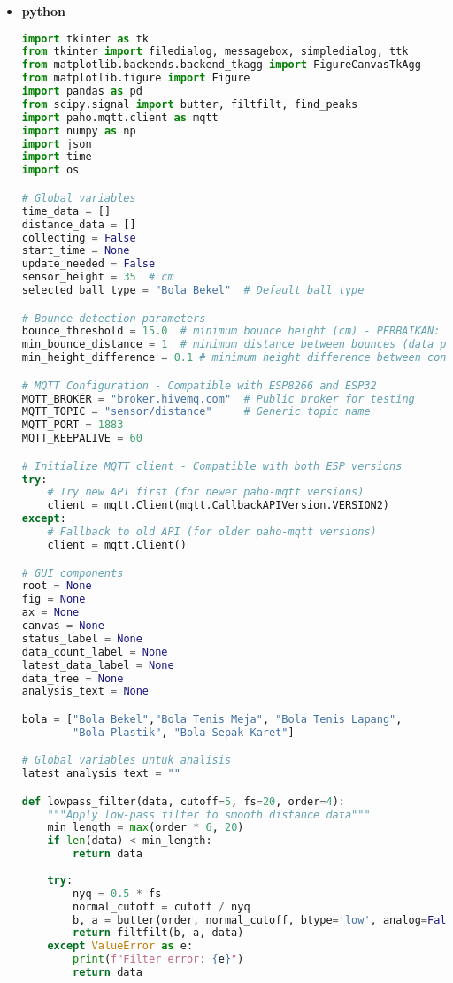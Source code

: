 \begin{itemize}

   \item \textbf{python}
   \begin{scriptsize}
    \begin{lstlisting}[language=python]
        import tkinter as tk
from tkinter import filedialog, messagebox, simpledialog, ttk
from matplotlib.backends.backend_tkagg import FigureCanvasTkAgg
from matplotlib.figure import Figure
import pandas as pd
from scipy.signal import butter, filtfilt, find_peaks
import paho.mqtt.client as mqtt
import numpy as np
import json
import time
import os

# Global variables
time_data = []
distance_data = []
collecting = False
start_time = None
update_needed = False
sensor_height = 35  # cm
selected_ball_type = "Bola Bekel"  # Default ball type

# Bounce detection parameters
bounce_threshold = 15.0  # minimum bounce height (cm) - PERBAIKAN: dari 5.0 ke 15.0
min_bounce_distance = 1  # minimum distance between bounces (data points)
min_height_difference = 0.1 # minimum height difference between consecutive peaks (cm)

# MQTT Configuration - Compatible with ESP8266 and ESP32
MQTT_BROKER = "broker.hivemq.com"  # Public broker for testing
MQTT_TOPIC = "sensor/distance"     # Generic topic name
MQTT_PORT = 1883
MQTT_KEEPALIVE = 60

# Initialize MQTT client - Compatible with both ESP versions
try:
    # Try new API first (for newer paho-mqtt versions)
    client = mqtt.Client(mqtt.CallbackAPIVersion.VERSION2)
except:
    # Fallback to old API (for older paho-mqtt versions)
    client = mqtt.Client()

# GUI components
root = None
fig = None
ax = None
canvas = None
status_label = None
data_count_label = None
latest_data_label = None
data_tree = None
analysis_text = None

bola = ["Bola Bekel","Bola Tenis Meja", "Bola Tenis Lapang", 
        "Bola Plastik", "Bola Sepak Karet"]

# Global variables untuk analisis
latest_analysis_text = ""

def lowpass_filter(data, cutoff=5, fs=20, order=4):
    """Apply low-pass filter to smooth distance data"""
    min_length = max(order * 6, 20)
    if len(data) < min_length:
        return data
    
    try:
        nyq = 0.5 * fs
        normal_cutoff = cutoff / nyq
        b, a = butter(order, normal_cutoff, btype='low', analog=False)
        return filtfilt(b, a, data)
    except ValueError as e:
        print(f"Filter error: {e}")
        return data


\end{lstlisting}
\end{scriptsize}
\end{itemize}
